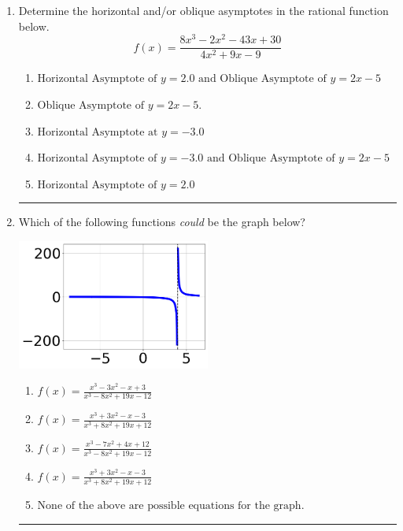 \documentclass[14pt]{extbook}
\newcommand{\litem}[1]{\item#1\hspace*{-1cm}\rule{\textwidth}{0.4pt}}
\begin{document}
\begin{enumerate}
{\begin{enumerate}[label=\Alph*.]
\end{enumerate} }
\litem{
Determine the horizontal and/or oblique asymptotes in the rational function below.\[ f(x) = \frac{8x^{3} -2 x^{2} -43 x + 30}{4x^{2} +9 x -9} \]\begin{enumerate}[label=\Alph*.]
\item \( \text{Horizontal Asymptote of } y = 2.0 \text{ and Oblique Asymptote of } y = 2x -5 \)
\item \( \text{Oblique Asymptote of } y = 2x -5. \)
\item \( \text{Horizontal Asymptote at } y = -3.0 \)
\item \( \text{Horizontal Asymptote of } y = -3.0 \text{ and Oblique Asymptote of } y = 2x -5 \)
\item \( \text{Horizontal Asymptote of } y = 2.0  \)

\end{enumerate} }
\litem{
Which of the following functions \textit{could} be the graph below?
\begin{center}
    \includegraphics[width=0.5\textwidth]{../Figures/identifyGraphOfRationalFunctionA.png}
\end{center}
\begin{enumerate}[label=\Alph*.]
\item \( f(x)=\frac{x^{3} -3 x^{2} -x + 3}{x^{3} -8 x^{2} +19 x -12} \)
\item \( f(x)=\frac{x^{3} +3 x^{2} -x -3}{x^{3} +8 x^{2} +19 x + 12} \)
\item \( f(x)=\frac{x^{3} -7 x^{2} +4 x + 12}{x^{3} -8 x^{2} +19 x -12} \)
\item \( f(x)=\frac{x^{3} +3 x^{2} -x -3}{x^{3} +8 x^{2} +19 x + 12} \)
\item \( \text{None of the above are possible equations for the graph.} \)

\end{enumerate} }
\end{enumerate}
\end{document}
